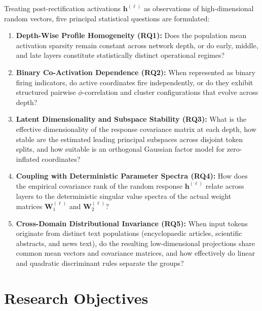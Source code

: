 \documentclass[12pt, a4paper, oneside]{report}
\theoremstyle{definition}
\newcommand{\vect}[1]{\mathbf{#1}}
\newcommand{\mat}[1]{\mathbf{#1}}
\begin{document}
Treating post-rectification activations $\vect{h}^{(\ell)}$ as observations of high-dimensional random vectors, five principal statistical questions are formulated:
\begin{enumerate}
    \item \textbf{Depth-Wise Profile Homogeneity (RQ1):} Does the population mean activation sparsity remain constant across network depth, or do early, middle, and late layers constitute statistically distinct operational regimes?
    \item \textbf{Binary Co-Activation Dependence (RQ2):} When represented as binary firing indicators, do active coordinates fire independently, or do they exhibit structured pairwise $\phi$-correlation and cluster configurations that evolve across depth?
    \item \textbf{Latent Dimensionality and Subspace Stability (RQ3):} What is the effective dimensionality of the response covariance matrix at each depth, how stable are the estimated leading principal subspaces across disjoint token splits, and how suitable is an orthogonal Gaussian factor model for zero-inflated coordinates?
    \item \textbf{Coupling with Deterministic Parameter Spectra (RQ4):} How does the empirical covariance rank of the random response $\vect{h}^{(\ell)}$ relate across layers to the deterministic singular value spectra of the actual weight matrices $\mat{W}_1^{(\ell)}$ and $\mat{W}_2^{(\ell)}$?
    \item \textbf{Cross-Domain Distributional Invariance (RQ5):} When input tokens originate from distinct text populations (encyclopaedic articles, scientific abstracts, and news text), do the resulting low-dimensional projections share common mean vectors and covariance matrices, and how effectively do linear and quadratic discriminant rules separate the groups?
\end{enumerate}

\section{Research Objectives}
\end{document}
